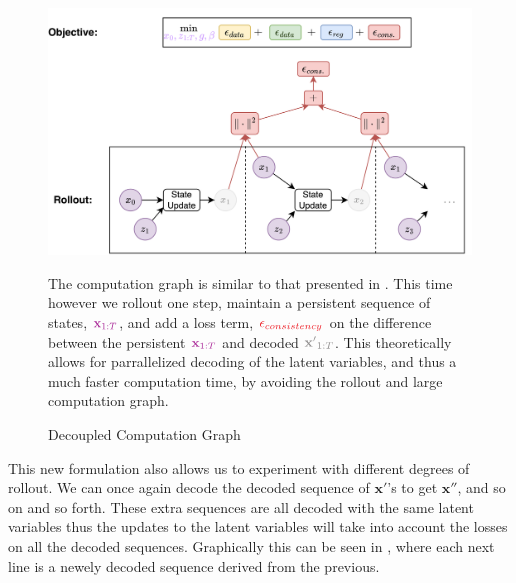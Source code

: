 \begin{figure}
    \label{fig:dimm_rollout_graph}
    \centering
    \includegraphics[width=1\textwidth]{Figures/humor/improvement/computation_graph_dimm.png}
    \caption{Decoupled Computation Graph}
    \medskip
    \small
    The computation graph is similar to that presented in . This time however we rollout one step, maintain a persistent sequence of states, $\textcolor{Mulberry}{\mathbf{x}_{1:T}}$, and add a loss term, $\textcolor{Red}{\epsilon_{consistency}}$ on the difference between the persistent $\textcolor{Mulberry}{\mathbf{x}_{1:T}}$ and decoded $\textcolor{Gray}{\mathbf{x'}_{1:T}}$. This theoretically allows for parrallelized decoding of the latent variables, and thus a much faster computation time, by avoiding the rollout and large computation graph.
\end{figure}

This new formulation also allows us to experiment with different degrees of rollout. We can once again decode the decoded sequence of $\mathbf{x'}$'s to get $\mathbf{x''}$, and so on and so forth. These extra sequences are all decoded with the same latent variables thus the updates to the latent variables will take into account the losses on all the decoded sequences. Graphically this can be seen in , where each next line is a newely decoded sequence derived from the previous.

